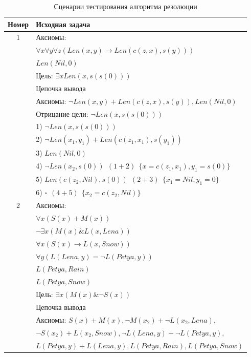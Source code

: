 \begin{table}[h!]
    \centering
    \caption{Сценарии тестирования алгоритма резолюции}
    \label{tab:resolve}
    \begin{tabular}{|c|l|}
        \hline
        Номер & Исходная задача \\
        \hline
        \hline
        1 & Аксиомы: \\
        & $\forall x \forall y \forall z (Len(x, y) \rightarrow Len(c(z, x), s(y)))$ \\
        & $Len(Nil, 0)$ \\
        & Цель: $\exists x Len(x, s(s(0)))$ \\
        \hline
        & Цепочка вывода \\
        & Аксиомы: $\neg Len(x, y) + Len(c(z, x), s(y)), Len(Nil, 0)$ \\
        & Отрицание цели: $\neg Len(x, s(s(0)))$ \\
        & 1) $\neg Len(x, s(s(0)))$ \\
        & 2) $\neg Len(x_1, y_1) + Len(c(z_1, x_1), s(y_1))$ \\
        & 3) $Len(Nil, 0)$ \\
        & 4) $\neg Len(x_2, s(0))~~(1+2)~~\{x=c(z_1, x_1), y_1=s(0)\}$ \\
        & 5) $Len(c(z_2, Nil), s(0))~~(2+3)~~\{x_1=Nil, y_1=0\}$ \\
        & 6) $\square~~(4+5)~~\{x_2=c(z_2, Nil)\}$ \\
        \hline
        \hline
        2 & Аксиомы: \\
        & $\forall x (S(x) + M(x))$ \\
        & $\neg \exists x (M(x) \& L(x, Lena))$ \\
        & $\forall x (S(x) \rightarrow L(x, Snow))$ \\
        & $\forall y (L(Lena, y) = \neg L(Petya, y))$ \\
        & $L(Petya, Rain)$ \\
        & $L(Petya, Snow)$ \\
        & Цель: $\exists x (M(x) \& \neg S(x))$ \\
        \hline
        & Цепочка вывода \\
        & Аксиомы: $S(x) + M(x), \neg M(x_2) + \neg L(x_2, Lena),$ \\
        & $\neg S(x_2) + L(x_2, Snow), \neg L(Lena, y) + \neg L(Petya, y),$ \\
        & $L(Petya, y) + L(Lena, y), L(Petya, Rain), L(Petya, Snow)$ \\

\end{tabular}
\end{table}

